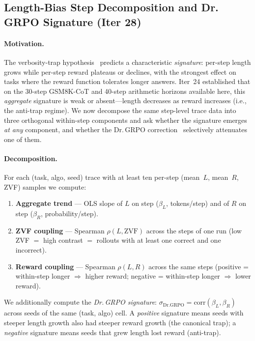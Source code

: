 \documentclass{article}
\begin{document}
 \subsection{Length-Bias Step Decomposition and Dr.\,GRPO Signature (Iter 28)}
\label{sec:length-bias-iter28}


\paragraph{Motivation.}
The verbosity-trap hypothesis~\cite{tong2025drgrpo} predicts a
characteristic \emph{signature}: per-step length grows while per-step reward
plateaus or declines, with the strongest effect on tasks where the reward
function tolerates longer answers. Iter~24 established that on the
30-step GSM8K-CoT and 40-step arithmetic horizons available here, this
\emph{aggregate} signature is weak or absent---length decreases as reward
increases (i.e., the anti-trap regime). We now decompose the same
step-level trace data into three orthogonal within-step components and ask
whether the signature emerges \emph{at any} component, and whether the
Dr.\,GRPO correction~\cite{tong2025drgrpo} selectively attenuates one of
them.

\paragraph{Decomposition.}
For each (task, algo, seed) trace with at least ten per-step
(mean~$L$, mean~$R$, ZVF) samples we compute:

\begin{enumerate}
\item \textbf{Aggregate trend} --- OLS slope of $L$ on step
  ($\beta_L$, tokens/step) and of $R$ on step
  ($\beta_R$, probability/step).
\item \textbf{ZVF coupling} --- Spearman $\rho(L, \mathrm{ZVF})$ across
  the steps of one run (low ZVF $=$ high contrast $=$ rollouts
  with at least one correct and one incorrect).
\item \textbf{Reward coupling} --- Spearman $\rho(L, R)$ across the same
  steps (positive = within-step longer $\Rightarrow$ higher reward;
  negative = within-step longer $\Rightarrow$ lower reward).
\end{enumerate}

We additionally compute the \emph{Dr.\,GRPO signature}:
$\sigma_{\mathrm{Dr.GRPO}} = \mathrm{corr}(\beta_L, \beta_R)$ across seeds
of the same (task, algo) cell. A \emph{positive} signature means seeds
with steeper length growth also had steeper reward growth (the
canonical trap); a \emph{negative} signature means seeds that grew
length lost reward (anti-trap).
\end{document}
